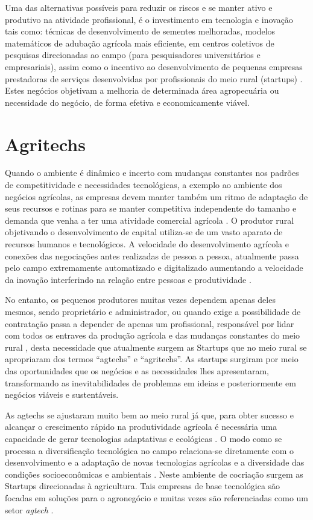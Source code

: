 Uma das alternativas possíveis para reduzir os riscos e se manter ativo e produtivo na atividade profissional, é o investimento em tecnologia e inovação tais como: técnicas de desenvolvimento de sementes melhoradas, modelos matemáticos de adubação agrícola mais eficiente, em centros coletivos de pesquisas direcionadas ao campo (para pesquisadores universitários e empresariais), assim como o incentivo ao desenvolvimento de pequenas empresas prestadoras de serviços desenvolvidas por profissionais do meio rural (startups) \cite{bochi_dorneles_coletivos_2014, gomes_inovacao_2014}.
Estes negócios objetivam a melhoria de determinada área agropecuária \cite{volpato_agtechs_2019} ou necessidade do negócio, de forma efetiva e economicamente viável. 

\section{Agritechs}

Quando o ambiente é dinâmico e incerto  com mudanças constantes nos padrões de competitividade e necessidades tecnológicas, a exemplo ao ambiente dos negócios agrícolas, as empresas devem manter também um ritmo de adaptação de seus recursos e rotinas para se manter competitiva independente do tamanho e demanda que venha a ter uma atividade comercial agrícola \cite{koch_reciprocal_2017}. O produtor rural objetivando o desenvolvimento de capital utiliza-se de um vasto aparato de recursos humanos e tecnológicos. A velocidade do desenvolvimento agrícola e conexões das negociações antes realizadas de pessoa a pessoa, atualmente passa pelo campo extremamente automatizado e digitalizado aumentando a velocidade da inovação interferindo na relação entre pessoas e produtividade \cite{campos_o_2016}.

No entanto, os pequenos produtores muitas vezes dependem apenas deles mesmos, sendo proprietário e administrador, ou quando exige a possibilidade de contratação passa a depender de apenas um profissional, responsável por lidar com todos os entraves da produção agrícola e das mudanças constantes do meio rural \cite{soares_relacao_2017}, desta necessidade que atualmente surgem as Startups que no meio rural se apropriaram dos termos “agtechs” e “agritechs”. As startups surgiram por meio das oportunidades que os negócios e as necessidades lhes apresentaram, transformando as inevitabilidades de problemas em ideias e posteriormente em negócios viáveis e sustentáveis. 

As agtechs se ajustaram muito bem ao meio rural já que, para obter sucesso e alcançar o crescimento rápido na produtividade agrícola é necessária uma capacidade de gerar tecnologias adaptativas e ecológicas \cite{contini_hayami_2019}. O modo como se processa a diversificação tecnológica no campo relaciona-se diretamente com o desenvolvimento e a adaptação de novas tecnologias agrícolas e a diversidade das condições socioeconômicas e ambientais \cite{fen-azmeyer_o_2019}. Neste ambiente de cocriação surgem as Startups direcionadas à agricultura. Tais empresas de base tecnológica são focadas em soluções para o agronegócio e muitas vezes são referenciadas como um setor \textit{agtech} \cite{blanco_agtechs_2020}.

